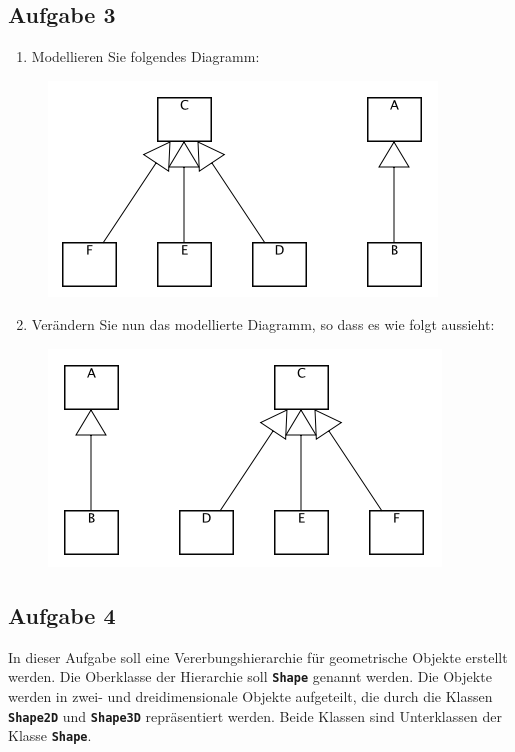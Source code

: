 \subsection*{Aufgabe 3}

\begin{enumerate}
    \item Modellieren Sie folgendes Diagramm:
\end{enumerate}

\begin{figure}[h]
    \includegraphics[scale=0.9]{../user-study-exercises/resources/exercise-3a}
\end{figure}

\begin{enumerate}
    \setcounter{enumi}{1}
    \item Verändern Sie nun das modellierte Diagramm, so dass es wie folgt aussieht:
\end{enumerate}

\begin{figure}[h]
    \includegraphics[scale=0.9]{../user-study-exercises/resources/exercise-3b}
\end{figure}

\subsection*{Aufgabe 4}

In dieser Aufgabe soll eine Vererbungshierarchie für geometrische Objekte erstellt werden. Die Oberklasse der Hierarchie soll \texttt{\textbf{Shape}} genannt werden. Die Objekte werden in zwei- und dreidimensionale Objekte aufgeteilt, die durch die Klassen \texttt{\textbf{Shape2D}} und \texttt{\textbf{Shape3D}} repräsentiert werden. Beide Klassen sind Unterklassen der Klasse \texttt{\textbf{Shape}}.

